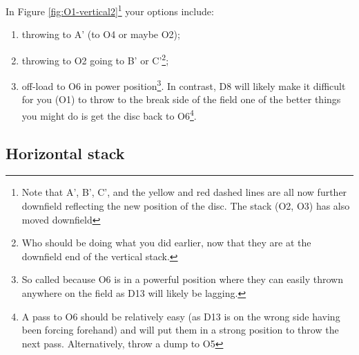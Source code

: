 \documentclass{tufte-handout}
\begin{document}
 In Figure \ref{fig:O1-vertical2}\footnote{
Note that A', B', C', and 
the yellow and red dashed lines 
are all now further downfield 
reflecting the new position of the disc.
The stack (O2, O3) 
has also moved downfield} 
your options include:
\begin{enumerate}
\item throwing to A' (to O4 or maybe O2);
\item throwing to O2 going to B' or C'\footnote{
Who should be doing what you did earlier, now that they are 
at the downfield end of the vertical stack.}; 
\item off-load to O6
in power position\footnote{
So called because 
O6 is 
in a powerful position 
where they can easily 
thrown anywhere on the field 
as D13 will likely be lagging.}. 
In contrast, D8 will likely
make it difficult for you (O1) to throw 
to the break side of the field
one of the better things you might do 
is get the disc back to O6\footnote{
A pass to O6 should be relatively easy (as D13 is on the wrong side having been forcing forehand) and will put them in a strong position to throw the next pass. Alternatively, throw a dump to O5}.


\end{enumerate}


\subsection{Horizontal stack}\label{sec:horizontall}
\end{document}
